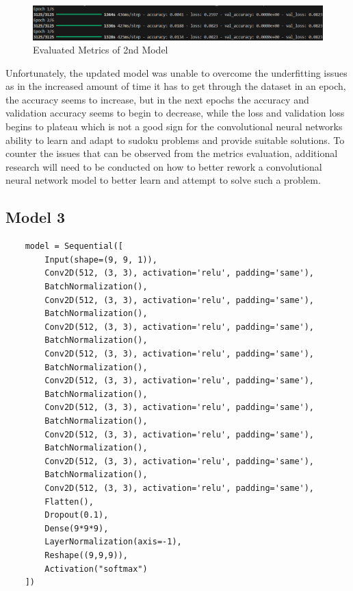 \documentclass[]{final_report}
\begin{document}
\begin{figure}[ht]
    \centering 
    \begin{minipage}{1.1\textwidth} 
        \includegraphics[width=\textwidth]{images/2nd model metrics.png} 
        \caption{Evaluated Metrics of 2nd Model} 
        \label{fig: Evaluated Metrics of 2nd Model} 
    \end{minipage} 
    \hfill 
\end{figure}

Unfortunately, the updated model was unable to overcome the underfitting issues as in the increased amount of time it has to get through the dataset in an epoch, the accuracy seems to increase, but in the next epochs the accuracy and validation accuracy seems to begin to decrease, while the loss and validation loss begins to plateau which is not a good sign for the convolutional neural networks ability to learn and adapt to sudoku problems and provide suitable solutions. To counter the issues that can be observed from the metrics evaluation, additional research will need to be conducted on how to better rework a convolutional neural network model to better learn and attempt to solve such a problem.

\subsection{Model 3}

\begin{verbatim}
    model = Sequential([
        Input(shape=(9, 9, 1)),
        Conv2D(512, (3, 3), activation='relu', padding='same'),
        BatchNormalization(),
        Conv2D(512, (3, 3), activation='relu', padding='same'),
        BatchNormalization(),
        Conv2D(512, (3, 3), activation='relu', padding='same'),
        BatchNormalization(),
        Conv2D(512, (3, 3), activation='relu', padding='same'),
        BatchNormalization(),
        Conv2D(512, (3, 3), activation='relu', padding='same'),
        BatchNormalization(),
        Conv2D(512, (3, 3), activation='relu', padding='same'),
        BatchNormalization(),
        Conv2D(512, (3, 3), activation='relu', padding='same'),
        BatchNormalization(),
        Conv2D(512, (3, 3), activation='relu', padding='same'),
        BatchNormalization(),
        Conv2D(512, (3, 3), activation='relu', padding='same'),
        Flatten(),
        Dropout(0.1),
        Dense(9*9*9),
        LayerNormalization(axis=-1),
        Reshape((9,9,9)),
        Activation("softmax")
    ])
\end{verbatim}
\end{document}
